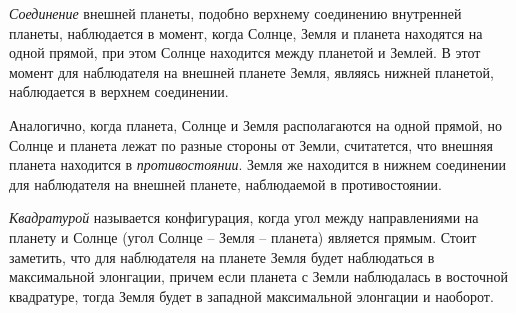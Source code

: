 {\itshape Соединение} внешней планеты, подобно верхнему 
соединению внутренней планеты, наблюдается в момент, 
когда Солнце, Земля и планета находятся на одной прямой, 
при этом Солнце находится между планетой и Землей. В 
этот момент для наблюдателя на внешней планете Земля, 
являясь нижней планетой, наблюдается в верхнем 
соединении.

Аналогично, когда планета, Солнце и Земля располагаются 
на одной прямой, но Солнце и планета лежат по разные 
стороны от Земли, считатется, что внешняя планета 
находится в {\itshape противостоянии}. Земля же находится 
в нижнем соединении для наблюдателя на внешней планете, 
наблюдаемой в противостоянии.

{\itshape Квадратурой} называется конфигурация, когда 
угол между направлениями на планету и Солнце (угол Солнце 
-- Земля -- планета) является прямым. Стоит заметить, 
что для наблюдателя на планете Земля будет наблюдаться 
в максимальной элонгации, причем если планета с Земли 
наблюдалась в восточной квадратуре, тогда Земля будет 
в западной максимальной элонгации и наоборот.
